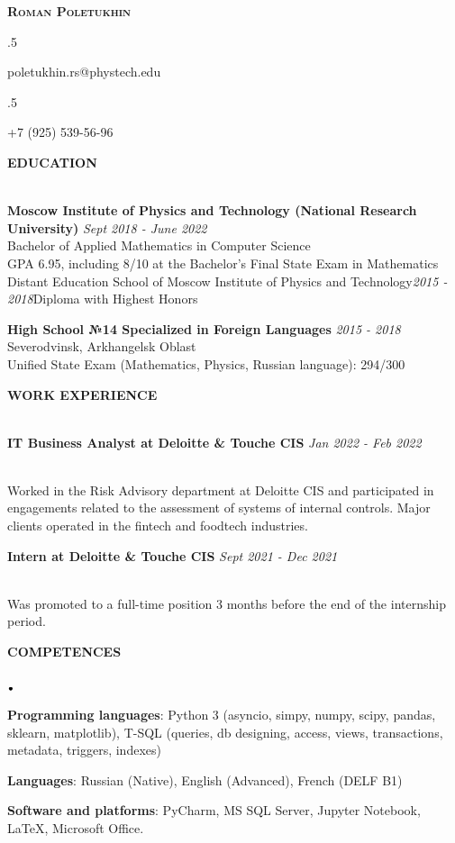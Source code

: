\documentclass[11pt]{article}
\newcommand{\lineunder}{\vspace*{-8pt} \\ \hspace*{-18pt} \hrulefill \\}
\newcommand{\header}[1]{{\hspace*{-15pt}\vspace*{6pt} \textsc{#1}} \vspace*{-6pt} \lineunder}
\newcommand{\contact}[2]{
\begin{center}
{\LARGE \scshape {#1}}\\
#2
\end{center}
\vspace*{-8pt}
}
\newcommand{\lbt}{\,\begin{picture}(-1,1)(-1,-3)\circle*{3}\end{picture}\ }
\newenvironment{achievements}{
    \begin{list}{$\lbt$}{
        \topsep 0pt
        \itemsep 0pt
        \addtolength{\leftmargin}{-0.1in}
    }
}
{
    \vspace*{4pt}
    \end{list}
}
\newcommand{\schoolwithcourses}[4]{
 \textbf{#1} \hfill{#2}\\
    #3\\
\vspace*{5pt}
}
\begin{document}

\small
\smallskip
\vspace*{-35pt}
\vspace{2mm}
\vspace{2mm}
\contact{\textbf{Roman Poletukhin}}
{}
\moveleft.5\hoffset\centerline{poletukhin.rs@phystech.edu}
\moveleft.5\hoffset\centerline{+7 (925) 539-56-96}
\vspace{2mm}


\header{\textbf{EDUCATION}}
\vspace{2mm}
\schoolwithcourses{Moscow Institute of Physics and Technology (National Research University)}{\textit{Sept 2018 - June 2022}}{Bachelor of Applied Mathematics in Computer Science \\ GPA 6.95, including 8/10 at the Bachelor's Final State Exam in Mathematics}


\schoolwithcourses{Distant Education School of Moscow Institute of Physics and Technology}{\textit{2015 - 2018}}{Diploma with Highest Honors}


\schoolwithcourses{High School №14 Specialized in Foreign Languages}{\textit{2015 - 2018}}{Severodvinsk, Arkhangelsk Oblast \\ Unified State Exam (Mathematics, Physics, Russian language): 294/300}
\hfill{}
\vspace{2mm}

\header{\textbf{WORK EXPERIENCE}}
\vspace{2mm}
\schoolwithcourses{IT Business Analyst at Deloitte \& Touche CIS}{\textit{Jan 2022 - Feb 2022}}
\vspace{1mm}
{Worked in the Risk Advisory department at Deloitte CIS and participated in engagements related to the assessment of systems of internal controls. Major clients operated in the fintech and foodtech industries.}

\vspace{2mm}
\schoolwithcourses{Intern at Deloitte \& Touche CIS}{\textit{Sept 2021 - Dec 2021}}
\vspace{1mm}
{Was promoted to a full-time position 3 months before the end of the internship period.}

\hfill{}
\vspace{2mm}


\header{\textbf{COMPETENCES}}
\vspace{2mm}
\begin{achievements}
\justifying
\item \textbf{Programming languages}: Python 3 (asyncio, simpy, numpy, scipy, pandas, sklearn, matplotlib), T-SQL (queries, db designing, access, views, transactions, metadata, triggers, indexes)
\item \textbf{Languages}: Russian (Native), English (Advanced), French (DELF B1) 
\item \textbf{Software and platforms}: PyCharm, MS SQL Server, Jupyter Notebook, \LaTeX, Microsoft Office.
\end{achievements}
\hfill{}
\end{document}
